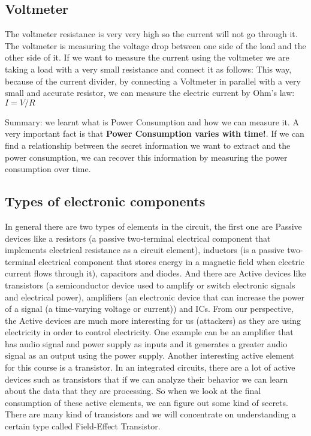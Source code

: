 \subsection{Voltmeter}
The voltmeter resistance is very very high so the current will not go through it. The voltmeter is measuring the voltage drop between one side of the load and the other side of it. If we want to measure the current using the voltmeter we are taking a load with a very small resistance and connect it as follows:
This way, because of the current divider, by connecting a Voltmeter in parallel with a very small and accurate resistor, we can measure the electric current by Ohm's law: $I=V/R$
 
Summary: we learnt what is Power Consumption and how we can measure it.
A very important fact is that \textbf{Power Consumption varies with time!}.
If we can find a relationship between the secret information we want to extract and the power consumption, we can recover this information by measuring the power consumption over time.

\subsection{Types of electronic components}
In general there are two types of elements in the circuit, the first one are Passive devices like a resistors (a passive two-terminal electrical component that implements electrical resistance as a circuit element), inductors (is a passive two-terminal electrical component that stores energy in a magnetic field when electric current flows through it), capacitors and diodes. And there are Active devices like transistors (a semiconductor device used to amplify or switch electronic signals and electrical power), amplifiers (an electronic device that can increase the power of a signal (a time-varying voltage or current)) and ICs. From our perspective, the Active devices are much more interesting for us (attackers) as they are using electricity in order to control electricity. One example can be an amplifier that has audio signal and power supply as inputs and it generates a greater audio signal as an output using the power supply. 
Another interesting active element for this course is a transistor. In an integrated circuits, there are a lot of active devices such as transistors  that if we can analyze their behavior we can learn about the data that they are processing. So when we look at the final consumption of these active elements, we can figure out some kind of secrets.
There are many kind of transistors and we will concentrate on understanding a certain type called Field-Effect Transistor.

